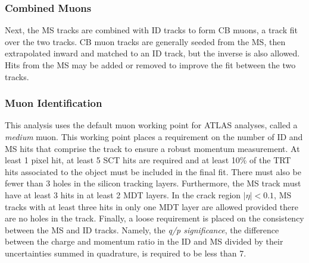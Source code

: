 \subsubsection{Combined Muons}
Next, the \ac{MS} tracks are combined with \ac{ID} tracks to form \ac{CB} muons, a track fit over the two tracks. \ac{CB} muon tracks are generally seeded from the \ac{MS}, then extrapolated inward and matched to an \ac{ID} track, but the inverse is also allowed. Hits from the \ac{MS} may be added or removed to improve the fit between the two tracks.



\subsubsection{Muon Identification}

This analysis uses the default muon working point for ATLAS analyses, called a \emph{medium} muon. This working point places a requirement on the number of \ac{ID} and \ac{MS} hits that comprise the track to ensure a robust momentum measurement. At least 1 pixel hit, at least 5 \ac{SCT} hits are required and at least 10\% of the \ac{TRT} hits associated to the object must be included in the final fit. There must also be fewer than 3 holes in the silicon tracking layers. Furthermore, the \ac{MS} track must have at least 3 hits in at least 2 \ac{MDT} layers. In the crack region $|\eta| < 0.1$, \ac{MS} tracks with at least three hits in only one \ac{MDT} layer are allowed provided there are no holes in the track. Finally, a loose requirement is placed on the consistency between the \ac{MS} and \ac{ID} tracks. Namely, the \emph{q/p significance}, the difference between the charge and momentum ratio in the \ac{ID} and \ac{MS} divided by their uncertainties summed in quadrature, is required to be less than 7. 


